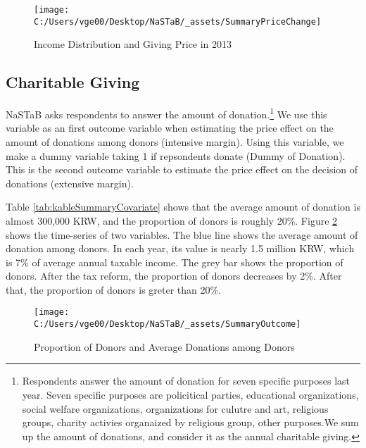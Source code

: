 \documentclass[ review  , 3p ]{elsarticle}
\begin{document}
  \begin{figure}[t]

  {\centering \texttt{[image: C:/Users/vge00/Desktop/NaSTaB/\_assets/SummaryPriceChange]} 

  }

  \caption{Income Distribution and Giving Price in 2013}\label{fig:showSummaryPriceChange}
  \end{figure}

  \hypertarget{charitable-giving}{%
  \subsection{Charitable Giving}\label{charitable-giving}}

  NaSTaB asks respondents to answer the amount of donation.\footnote{Respondents answer the amount of donation for seven specific purposes last year. Seven specific purposes are policitical parties, educational organizations, social welfare organizations, organizations for culutre and art, religious groups, charity activies organaized by religious group, other purposes.We sum up the amount of donations, and consider it as the annual charitable giving.}
  We use this variable as an first outcome variable when
  estimating the price effect on the amount of donations among donors (intensive margin).
  Using this variable, we make a dummy variable taking 1 if repsondents donate (Dummy of Donation).
  This is the second outcome variable
  to estimate the price effect on the decision of donations (extensive margin).

  Table \ref{tab:kableSummaryCovariate} shows that
  the average amount of donation is almost 300,000 KRW,
  and the proportion of donors is roughly 20\%.
  Figure \ref{fig:showDonationRate} shows the time-series of two variables.
  The blue line shows the average amount of donation among donors.
  In each year, its value is nearly 1.5 million KRW,
  which is 7\% of average annual taxable income.
  The grey bar shows the proportion of donors.
  After the tax reform, the proportion of donors decreases by 2\%.
  After that, the proportion of donors is greter than 20\%.

  \begin{figure}[t]

  {\centering \texttt{[image: C:/Users/vge00/Desktop/NaSTaB/\_assets/SummaryOutcome]} 

  }

  \caption{Proportion of Donors and Average Donations among Donors}\label{fig:showDonationRate}
  \end{figure}
\end{document}
